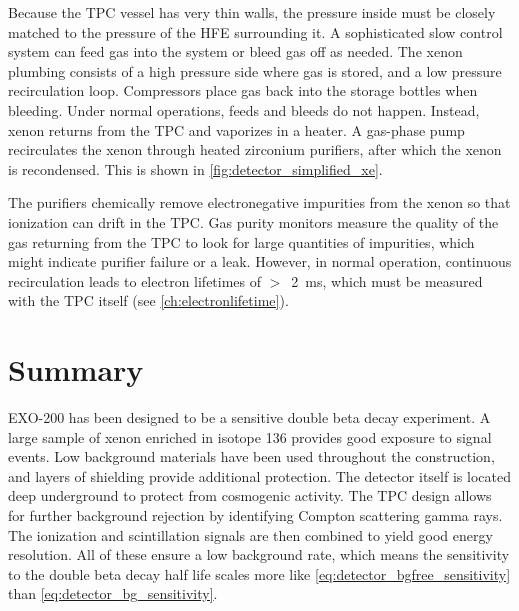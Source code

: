 \documentclass[herrin-thesis.tex]{subfiles}
\begin{document}
Because the TPC vessel has very thin walls, the pressure inside must be closely matched to the pressure of the HFE surrounding it. A sophisticated slow control system can feed gas into the system or bleed gas off as needed. The xenon plumbing consists of a high pressure side where gas is stored, and a low pressure recirculation loop. Compressors place gas back into the storage bottles when bleeding. Under normal operations, feeds and bleeds do not happen. Instead, xenon returns from the TPC and vaporizes in a heater. A gas-phase pump\cite{LePort:2011fk} recirculates the xenon through heated zirconium purifiers, after which the xenon is recondensed. This is shown in \cref{fig:detector_simplified_xe}. 

The purifiers chemically remove electronegative impurities from the xenon so that ionization can drift in the TPC. Gas purity monitors\cite{Dobi:2011zr} measure the quality of the gas returning from the TPC to look for large quantities of impurities, which might indicate purifier failure or a leak. However, in normal operation, continuous recirculation leads to electron lifetimes of \(>\)~\SI{2}{\ms}, which must be measured with the TPC itself  (see \cref{ch:electronlifetime}).

\section{Summary}
EXO-200 has been designed to be a sensitive double beta decay experiment. A large sample of xenon enriched in isotope 136 provides good exposure to signal events. Low background materials have been used throughout the construction, and layers of shielding provide additional protection. The detector itself is located deep underground to protect from cosmogenic activity. The TPC design allows for further background rejection by identifying Compton scattering gamma rays. The ionization and scintillation signals are then combined to yield good energy resolution. All of these ensure a low background rate, which means the sensitivity to the double beta decay half life scales more like \cref{eq:detector_bgfree_sensitivity} than \cref{eq:detector_bg_sensitivity}.
\end{document}
